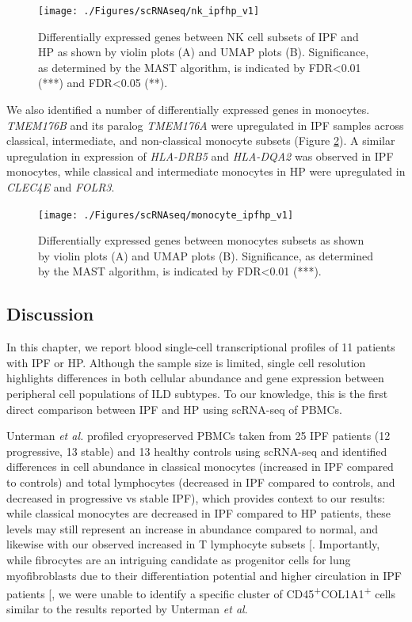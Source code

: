 \documentclass[
]{article}
\begin{document}
\begin{figure}
\texttt{[image: ./Figures/scRNAseq/nk\_ipfhp\_v1]} \caption[scRNA-seq NK DEGs]{Differentially expressed genes between NK cell subsets of IPF and HP as shown by violin plots (A) and UMAP plots (B). Significance, as determined by the MAST algorithm, is indicated by FDR\textless0.01 (***) and FDR\textless0.05 (**).}\label{fig:scrnaseqnk}
\end{figure}

We also identified a number of differentially expressed genes in monocytes. \textit{TMEM176B} and its paralog \textit{TMEM176A} were upregulated in IPF samples across classical, intermediate, and non-classical monocyte subsets (Figure \ref{fig:scrnaseqmono}). A similar upregulation in expression of \textit{HLA-DRB5} and \textit{HLA-DQA2} was observed in IPF monocytes, while classical and intermediate monocytes in HP were upregulated in \textit{CLEC4E} and \textit{FOLR3}.



\begin{figure}
\texttt{[image: ./Figures/scRNAseq/monocyte\_ipfhp\_v1]} \caption[scRNA-seq monocyte DEGs]{Differentially expressed genes between monocytes subsets as shown by violin plots (A) and UMAP plots (B). Significance, as determined by the MAST algorithm, is indicated by FDR\textless0.01 (***).}\label{fig:scrnaseqmono}
\end{figure}

\subsection{Discussion}\label{discussion-3}

In this chapter, we report blood single-cell transcriptional profiles of 11 patients with IPF or HP. Although the sample size is limited, single cell resolution highlights differences in both cellular abundance and gene expression between peripheral cell populations of ILD subtypes. To our knowledge, this is the first direct comparison between IPF and HP using scRNA-seq of PBMCs.

Unterman \textit{et al.} profiled cryopreserved PBMCs taken from 25 IPF patients (12 progressive, 13 stable) and 13 healthy controls using scRNA-seq and identified differences in cell abundance in classical monocytes (increased in IPF compared to controls) and total lymphocytes (decreased in IPF compared to controls, and decreased in progressive vs stable IPF), which provides context to our results: while classical monocytes are decreased in IPF compared to HP patients, these levels may still represent an increase in abundance compared to normal, and likewise with our observed increased in T lymphocyte subsets {[}\citeproc{ref-unterman_single-cell_2024}{167}{]}. Importantly, while fibrocytes are an intriguing candidate as progenitor cells for lung myofibroblasts due to their differentiation potential and higher circulation in IPF patients {[}\citeproc{ref-heukels_fibrocytes_2018}{168}{]}, we were unable to identify a specific cluster of CD45\textsuperscript{+}COL1A1\textsuperscript{+} cells similar to the results reported by Unterman \textit{et al}.
\end{document}
